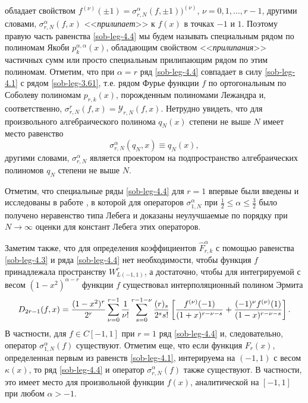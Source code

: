 обладает свойством $f^{(\nu)}(\pm1)=\sigma_{r,N}^\alpha(f,\pm1))^{(\nu)}$, $\nu=0,1,\ldots, r-1$, другими словами, $\sigma_{r,N}^\alpha(f,x)$ <<\textit{прилипает}>> к $f(x)$ в точках $-1$ и $1$. Поэтому правую часть  равенства \eqref{sob-leg-4.4} мы будем называть специальным рядом по полиномам Якоби $p_{k}^{\alpha,\alpha}(x)$, обладающим свойством <<\textit{прилипания}>> частичных сумм или просто специальным прилипающим рядом по этим  полиномам.  Отметим, что при $\alpha=r$ ряд \eqref{sob-leg-4.4} совпадает в силу \eqref{sob-leg-4.1} с рядом \eqref{sob-leg-3.61}, т.е. рядом Фурье функции $f$ по ортогональным по Соболеву полиномам $p_{r,k}(x)$, порожденным полиномами Лежандра и, соответственно, $\sigma_{r,N}^r(f,x)=\mathcal{Y}_{r,N}(f,x)$. Нетрудно увидеть, что для произвольного алгебраического полинома $q_N(x)$ степени не выше $N$ имеет место равенство
\begin{equation}\label{sob-leg-4.6}
\sigma_{r,N}^\alpha(q_N,x)\equiv q_N(x),
\end{equation}
другими словами, $\sigma_{r,N}^\alpha$ является проектором на подпространство алгебраических полиномов $q_N$ степени не выше $N$.

Отметим, что специальные ряды \eqref{sob-leg-4.4} для $r=1$ впервые были введены и исследованы в работе \cite{sob-leg-sharap3}, в которой для операторов $\sigma_{1,N}^\alpha$  при $\frac12\le \alpha\le\frac32$ было получено неравенство типа Лебега и доказаны неулучшаемые по порядку при $N\to\infty$ оценки для констант Лебега этих операторов.

Заметим также, что для определения коэффициентов $\hat F^\alpha_{r,k}$  с помощью равенства \eqref{sob-leg-4.3} и ряда \eqref{sob-leg-4.4} нет необходимости, чтобы функция $f$ принадлежала пространству $W^r_{L(-1,1)}$, а достаточно, чтобы для интегрируемой с весом $(1-x^2)^{\alpha-r}$ функции $f$ существовал интерполяционный полином Эрмита
\begin{equation}\label{sob-leg-4.7}
D_{2r-1}(f,x)=
{(1-x^2)^r\over2^r}\sum_{\nu=0}^{r-1}{1\over\nu!}
\sum_{s=0}^{r-1-\nu}{(r)_s\over2^ss!}\left[{f^{(\nu)}(-1)\over(1+x)^{r-\nu-s}}+
{(-1)^\nu f^{(\nu)}(1)\over(1-x)^{r-\nu-s}}\right].
\end{equation}
В частности, для $f\in C[-1,1]$ при $r=1$ ряд \eqref{sob-leg-4.4} и, следовательно,  оператор $\sigma_{1,N}^\alpha(f)$ существуют. Отметим еще, что если функция $F_r(x)$, определенная первым из равенств \eqref{sob-leg-4.1}, интерируема на $(-1,1)$ с весом $\kappa(x)$, то ряд \eqref{sob-leg-4.4} и оператор $\sigma_{r,N}^\alpha(f)$ также существуют. В частности, это имеет место для  произвольной функции $f(x)$, аналитической на $[-1,1]$ при любом $\alpha>-1$.

